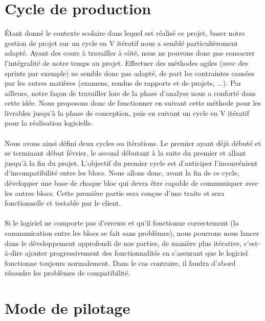 \section{Cycle de production}

Étant donné le contexte scolaire dans lequel est réalisé ce projet, baser notre gestion de projet sur un cycle en V itératif nous a semblé particulièrement adapté. Ayant des cours à travailler à côté, nous ne pouvons donc pas consacrer l’intégralité de notre temps au projet. Effectuer des méthodes agiles (avec des sprints par exemple) ne semble donc pas adapté, de part les contraintes causées par les autres matières (examens, rendus de rapports et de projets, ...). Par ailleurs, notre
façon de travailler lors de la phase d’analyse nous a conforté dans cette idée. Nous proposons donc de fonctionner en suivant cette méthode pour les livrables jusqu’à la phase de conception, puis en suivant un cycle en V itératif pour la réalisation logicielle. 

\paragraph{}

Nous avons ainsi défini deux cycles ou itérations. Le premier ayant déjà débuté et se terminant début février, le second débutant à la suite du premier et allant jusqu’à la fin du projet. L’objectif du premier cycle est d’anticiper l’inconvénient d’incompatibilité entre les blocs. Nous allons donc, avant la fin de ce cycle, développer une base de chaque bloc qui devra être capable de communiquer avec les autres blocs. Cette première partie sera conçue d’une traite et sera fonctionnelle et testable par le client.

\newpage

\paragraph{}

Si le logiciel ne comporte pas d’erreurs et qu’il fonctionne correctement (la communication entre les blocs se fait sans problèmes), nous pourrons nous lancer dans le développement approfondi de nos parties, de manière plus itérative, c’est-à-dire ajouter progressivement des fonctionnalités en s’assurant que le logiciel fonctionne toujours normalement. Dans le cas contraire, il faudra d’abord résoudre les problèmes de compatibilité.

\section{Mode de pilotage}

